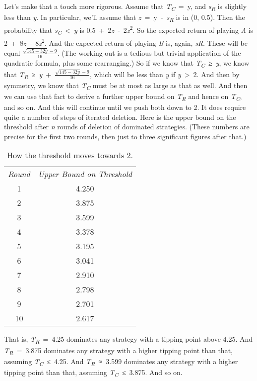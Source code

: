 \documentclass[
  12pt,
  letterpaper,
]{scrbook}
\begin{document}
Let's make that a touch more rigorous. Assume that
\emph{T\textsubscript{C}}~=~y, and \emph{s\textsubscript{R}} is slightly
less than \emph{y}. In particular, we'll assume that
\emph{z}~=~y~-~\emph{s\textsubscript{R}} is in (0, 0.5). Then the
probability that \emph{s\textsubscript{C}}~\textless~\emph{y} is
0.5~+~2\emph{z}~‑~2\emph{z}\textsuperscript{2}. So the expected return
of playing \emph{A} is 2~+~8\emph{z}~‑~8\emph{z}\textsuperscript{2}. And
the expected return of playing \emph{B} is, again, \emph{sR}. These will
be equal \(\frac{\sqrt{145-32y}-9}{16}\). (The working out is a tedious
but trivial application of the quadratic formula, plus some
rearranging.) So if we know that \emph{T\textsubscript{C}}~≥~\emph{y},
we know that
\emph{T\textsubscript{R}}~≥~\emph{y}~+~\(\frac{\sqrt{145-32y}-9}{16}\),
which will be less than \emph{y} if \emph{y}~\textgreater~2. And then by
symmetry, we know that \emph{T\textsubscript{C}} must be at most as
large as that as well. And then we can use that fact to derive a further
upper bound on \emph{T\textsubscript{R}} and hence on
\emph{T\textsubscript{C}}, and so on. And this will continue until we
push both down to 2. It does require quite a number of steps of iterated
deletion. Here is the upper bound on the threshold after \emph{n} rounds
of deletion of dominated strategies. (These numbers are precise for the
first two rounds, then just to three significant figures after that.)

\begin{longtable}[]{@{}cc@{}}
\caption{How the threshold moves towards
2.}\label{tbl-threshold}\tabularnewline
\toprule\noalign{}
\endfirsthead
\endhead
\bottomrule\noalign{}
\endlastfoot
\emph{Round} & \emph{Upper Bound on Threshold} \\
1 & 4.250 \\
2 & 3.875 \\
3 & 3.599 \\
4 & 3.378 \\
5 & 3.195 \\
6 & 3.041 \\
7 & 2.910 \\
8 & 2.798 \\
9 & 2.701 \\
10 & 2.617 \\
\end{longtable}

That is, \emph{T\textsubscript{R}}~=~4.25 dominates any strategy with a
tipping point above 4.25. And \emph{T\textsubscript{R}}~=~3.875
dominates any strategy with a higher tipping point than that, assuming
\emph{T\textsubscript{C}}~≤~4.25. And \emph{T\textsubscript{R}}~≈~3.599
dominates any strategy with a higher tipping point than that, assuming
\emph{T\textsubscript{C}}~≤~3.875. And so on.
\end{document}
